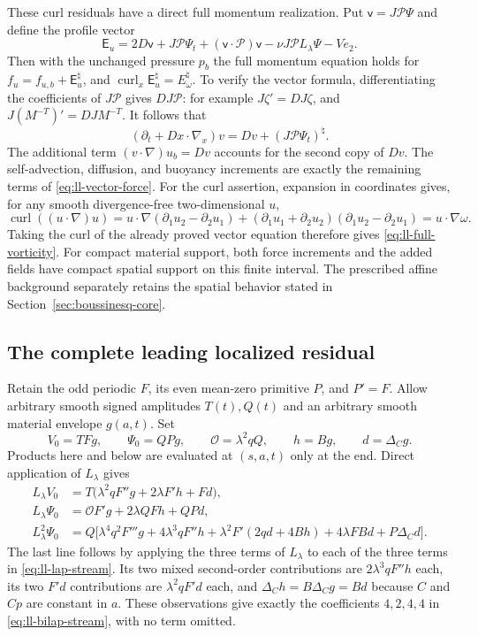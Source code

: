 These curl residuals have a direct full momentum realization. Put
$\mathsf v=J\mathcal P\Psi$ and define the profile vector
\begin{equation}
\mathsf E_u=2D\mathsf v+J\mathcal P\Psi_t
 +(\mathsf v\cdot\mathcal P)\mathsf v
 -\nu J\mathcal P L_\lambda\Psi-Ve_2.
\label{eq:ll-vector-force}
\end{equation}
Then with the unchanged pressure $p_b$ the full momentum equation
holds for $f_u=f_{u,b}+\mathsf E_u^\natural$, and
$\operatorname{curl}_x\mathsf E_u^\natural=E_\omega^\natural$.
To verify the vector formula, differentiating the coefficients of
$J\mathcal P$ gives $D J\mathcal P$: for example
$J\zeta'=DJ\zeta$, and $J(M^{-T})'=DJM^{-T}$.
It follows that
\[
(\partial_t+Dx\cdot\nabla_x)v
=Dv+(J\mathcal P\Psi_t)^\natural.
\]
The additional term $(v\cdot\nabla)u_b=Dv$ accounts for the second
copy of $Dv$. The self-advection, diffusion, and buoyancy increments
are exactly the remaining terms of \eqref{eq:ll-vector-force}.
For the curl assertion, expansion in coordinates gives, for any smooth
divergence-free two-dimensional $u$,
\[
\operatorname{curl}((u\cdot\nabla)u)
=u\cdot\nabla(\partial_1u_2-\partial_2u_1)
 +(\partial_1u_1+\partial_2u_2)
  (\partial_1u_2-\partial_2u_1)
=u\cdot\nabla\omega.
\]
Taking the curl of the already proved vector equation therefore gives
\eqref{eq:ll-full-vorticity}. For compact material support, both force
increments and the added fields have compact spatial support on this
finite interval. The prescribed affine background separately retains
the spatial behavior stated in Section~\ref{sec:boussinesq-core}.

\subsection{The complete leading localized residual}

Retain the odd periodic $F$, its even mean-zero primitive $P$, and
$P'=F$. Allow arbitrary smooth signed amplitudes $T(t),Q(t)$ and an
arbitrary smooth material envelope $g(a,t)$. Set
\[
V_0=TFg,\qquad \Psi_0=QP g,\qquad
\mathcal O=\lambda^2qQ,\qquad h=Bg,\qquad d=\Delta_Cg.
\]
Products here and below are evaluated at $(s,a,t)$ only at the end.
Direct application of $L_\lambda$ gives
\begin{align}
L_\lambda V_0&=T\bigl(\lambda^2qF''g+2\lambda F'h+Fd\bigr),
\label{eq:ll-lap-scalar}\\
L_\lambda\Psi_0&=\mathcal O F'g+2\lambda QFh+QP d,
\label{eq:ll-lap-stream}\\
L_\lambda^2\Psi_0&=Q\bigl[
 \lambda^4q^2F'''g+4\lambda^3qF''h
 +\lambda^2F'(2qd+4Bh)+4\lambda F Bd+P\Delta_Cd\bigr].
\label{eq:ll-bilap-stream}
\end{align}
The last line follows by applying the three terms of $L_\lambda$
to each of the three terms in \eqref{eq:ll-lap-stream}.
Its two mixed second-order contributions are
$2\lambda^3qF''h$ each, its two $F'd$ contributions are
$\lambda^2qF'd$ each, and
$\Delta_Ch=B\Delta_Cg=Bd$ because $C$ and $Cp$ are constant
in $a$. These observations give exactly the coefficients $4,2,4,4$
in \eqref{eq:ll-bilap-stream}, with no term omitted.

